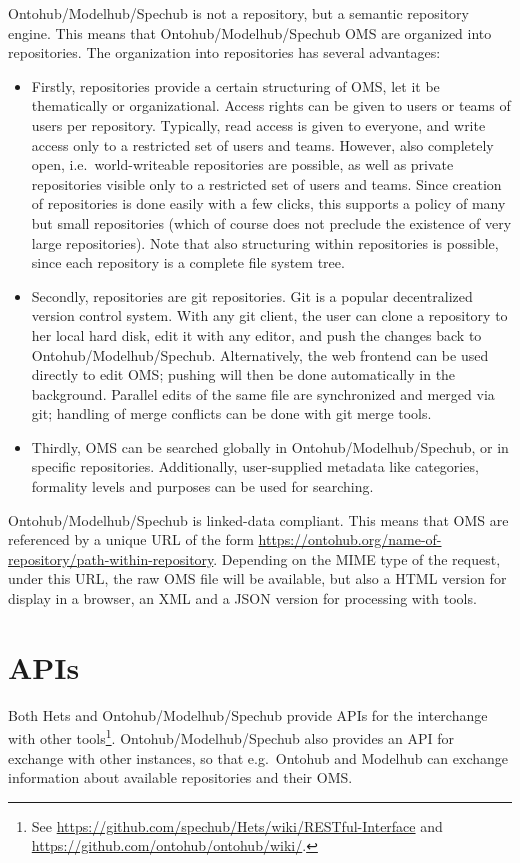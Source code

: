\documentclass[10pt,fleqn,final]{scrreprt}
\newcommand{\sclause}[1]{\section{#1}}
\begin{document}
Ontohub/Modelhub/Spechub is not a repository, but a semantic repository engine. This
means that Ontohub/Modelhub/Spechub OMS are organized into repositories.
The
organization into repositories has several advantages:
\begin{itemize}
\item
 Firstly, repositories provide a certain structuring of OMS,
 let it be thematically or organizational. Access rights can be given
 to users or teams of users per repository. Typically, read access is
 given to everyone, and write access only to a restricted set of users
 and teams. However, also completely open, i.e.\ world-writeable repositories
 are possible, as well as private repositories visible only to a
 restricted set of users and teams.  Since creation of repositories is
 done easily with a few clicks, this supports a policy of many but
 small repositories (which of course does not preclude the existence
 of very large repositories). Note that also structuring within
 repositories is possible, since each repository is a complete file
 system tree.

\item
 Secondly, repositories are git repositories. Git is a popular
 decentralized version control system. With any git client, the user
 can clone a repository to her local hard disk, edit it
 with any editor, and push the changes back to Ontohub/Modelhub/Spechub. Alternatively,
 the web frontend can be used directly to edit OMS; pushing
 will then be done automatically in the background. Parallel edits of
 the same file are synchronized and merged via git; handling of
 merge conflicts can be done with git merge tools.
\item
Thirdly, OMS can be searched globally in Ontohub/Modelhub/Spechub, or in
specific repositories. Additionally, user-supplied metadata like
categories, formality levels and purposes can be used for searching.
\end{itemize}

Ontohub/Modelhub/Spechub is linked-data compliant. This means that OMS are
referenced by a unique URL of the form
\url{https://ontohub.org/name-of-repository/path-within-repository}. Depending
on the MIME type of the request, under this URL, the raw OMS file
will be available, but also a HTML version for display in a browser, 
an XML and a JSON version for processing with tools.

\sclause{APIs}\label{c:APIs}

Both Hets and Ontohub/Modelhub/Spechub provide APIs for the interchange
with other tools\footnote{See \url{https://github.com/spechub/Hets/wiki/RESTful-Interface} and \url{https://github.com/ontohub/ontohub/wiki/}.}. Ontohub/Modelhub/Spechub also provides an API for
exchange with other instances, so that e.g.\ Ontohub and Modelhub
can exchange information about available repositories and their OMS.
\end{document}
